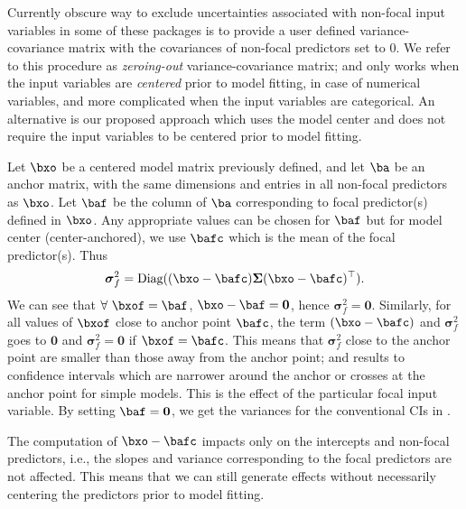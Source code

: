  Currently obscure way to exclude uncertainties associated with non-focal input variables in some of these packages is to provide a user defined variance-covariance matrix with the covariances of non-focal predictors set to $0$. We refer to this procedure as \emph{zeroing-out} variance-covariance matrix; and only works when the input variables are \emph{centered} prior to model fitting, in case of numerical variables, and more complicated when the input variables are categorical. An alternative is our proposed approach which uses the model center and does not require the input variables to be centered prior to model fitting.

Let $\bxo$ be a centered model matrix previously defined, and let $\ba$ be an anchor matrix, with the same dimensions and entries in all non-focal predictors as $\bxo$. Let $\baf$ be the column of $\ba$ corresponding to focal predictor(s) defined in $\bxo$. Any appropriate values can be chosen for $\baf$ but for model center (center-anchored), we use $\bafc$ which is the mean of the focal predictor(s). Thus 
%
\begin{align}\label{eq:centered_variance}
\boldsymbol\sigma_f^2 = \textrm{Diag}((\bxo - \bafc) \boldsymbol{\Sigma} (\bxo - \bafc)^\top).
\end{align}
%
We can see that $\forall ~\bxof=\baf$, $\bxo - \baf = \boldsymbol 0$, hence $\boldsymbol\sigma_f^2 = \boldsymbol{0}$. Similarly, for all values of $\bxof$ close to anchor point $\bafc$, the term $(\bxo - \bafc)$ and $\boldsymbol\sigma_f^2$ goes to $\boldsymbol 0$ and $\boldsymbol\sigma_f^2 = \boldsymbol 0$ if $\bxof=\bafc$. This means that $\boldsymbol\sigma_f^2$ close to the anchor point are smaller than those away from the anchor point; and results to confidence intervals which are narrower around the anchor or crosses at the anchor point for simple models. This is the effect of the particular focal input variable. By setting $\baf = \boldsymbol 0$, we get the variances for the conventional CIs in .


The computation of $\bxo - \bafc$ impacts only on the intercepts and non-focal predictors, i.e., the slopes and variance corresponding to the focal predictors are not affected. This means that we can still generate effects without necessarily centering the predictors prior to model fitting.

